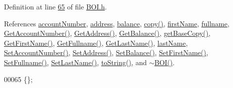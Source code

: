 Definition at line \hyperlink{_b_o_i_8h_source_l00065}{65} of file \hyperlink{_b_o_i_8h_source}{B\+O\+I.\+h}.



References \hyperlink{_b_o_i_8h_source_l00099}{account\+Number}, \hyperlink{_b_o_i_8h_source_l00101}{address}, \hyperlink{_b_o_i_8h_source_l00100}{balance}, \hyperlink{_b_o_i_8cpp_source_l00035}{copy()}, \hyperlink{_b_o_i_8h_source_l00097}{first\+Name}, \hyperlink{_b_o_i_8h_source_l00096}{fullname}, \hyperlink{_b_o_i_8cpp_source_l00078}{Get\+Account\+Number()}, \hyperlink{_b_o_i_8cpp_source_l00062}{Get\+Address()}, \hyperlink{_b_o_i_8cpp_source_l00070}{Get\+Balance()}, \hyperlink{_b_o_i_8cpp_source_l00022}{get\+Base\+Copy()}, \hyperlink{_b_o_i_8cpp_source_l00094}{Get\+First\+Name()}, \hyperlink{_b_o_i_8cpp_source_l00102}{Get\+Fullname()}, \hyperlink{_b_o_i_8cpp_source_l00086}{Get\+Last\+Name()}, \hyperlink{_b_o_i_8h_source_l00098}{last\+Name}, \hyperlink{_b_o_i_8cpp_source_l00074}{Set\+Account\+Number()}, \hyperlink{_b_o_i_8cpp_source_l00058}{Set\+Address()}, \hyperlink{_b_o_i_8cpp_source_l00066}{Set\+Balance()}, \hyperlink{_b_o_i_8cpp_source_l00090}{Set\+First\+Name()}, \hyperlink{_b_o_i_8cpp_source_l00098}{Set\+Fullname()}, \hyperlink{_b_o_i_8cpp_source_l00082}{Set\+Last\+Name()}, \hyperlink{_b_o_i_8cpp_source_l00054}{to\+String()}, and \hyperlink{_b_o_i_8cpp_source_l00012}{$\sim$\+B\+O\+I()}.


\begin{DoxyCode}
00065 \{\};
\end{DoxyCode}


